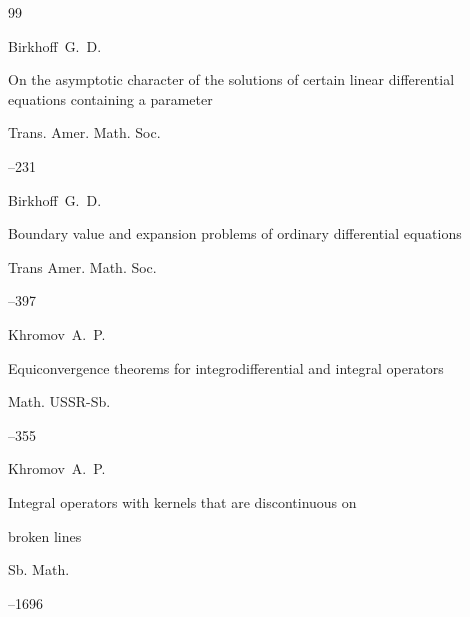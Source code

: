 \begin{thebibliography}{99}

\by Birkhoff~G.~D.

\paper  On the asymptotic character of the solutions of certain linear differential equations containing a parameter

\jour Trans. Amer. Math. Soc.




--231





\by Birkhoff~G.~D.

\paper  Boundary value and expansion problems of ordinary differential equations

\jour Trans Amer. Math. Soc.




--397





\by Khromov~A.~P.

\paper Equiconvergence theorems for integrodifferential and integral operators

\jour Math. USSR-Sb.




--355









\by Khromov~A.~P.

\paper Integral operators with kernels that are discontinuous on

broken lines

\jour Sb. Math.




--1696



\end{thebibliography}
